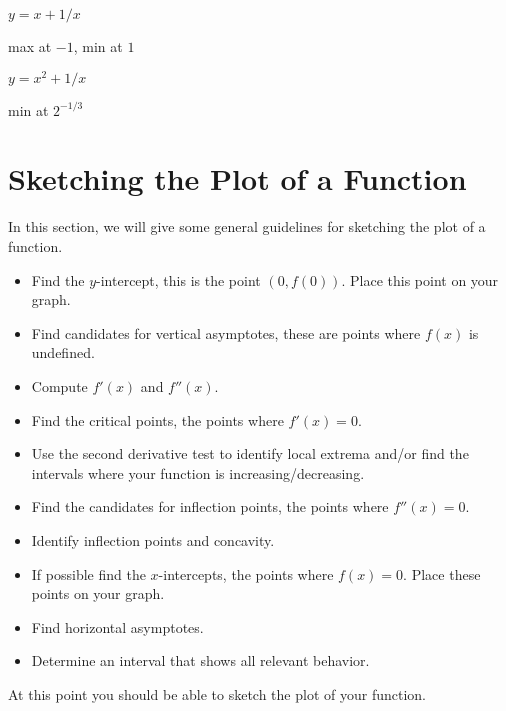 \begin{exercises}
\begin{exercise} $y = x+ 1/x$
\begin{answer} max at $-1$, min at $1$
\end{answer}\end{exercise}

\begin{exercise} $y = x^2+ 1/x$
\begin{answer} min at $2^{-1/3}$
\end{answer}\end{exercise}


\endtwocol
\end{exercises}












\section{Sketching the Plot of a Function} 


In this section, we will give some general guidelines for sketching
the plot of a function.

\begin{procedureForPlotting}\hfil
\begin{itemize}
\item Find the $y$-intercept, this is the point $(0,f(0))$. Place this
  point on your graph.
\item Find candidates for vertical asymptotes, these are points where
  $f(x)$ is undefined.
\item Compute $f'(x)$ and $f''(x)$.
\item Find the critical points, the points where $f'(x) = 0$. 
\item Use the second derivative test to identify local extrema and/or
  find the intervals where your function is increasing/decreasing.
\item Find the candidates for inflection points, the points where $f''(x) = 0$.
\item Identify inflection points and concavity.
\item If possible find the $x$-intercepts, the points where $f(x) =
  0$. Place these points on your graph.
\item Find horizontal asymptotes.
\item Determine an interval that shows all relevant behavior.
\end{itemize}
At this point you should be able to sketch the plot of your function.
\end{procedureForPlotting}

